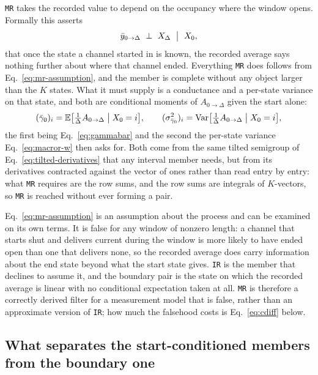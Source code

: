 \begin{appendixbox}
\texttt{MR} takes the recorded value to depend on the occupancy where the window opens. Formally
this asserts
\begin{equation}
  \bar y_{0\to\Delta} \ \perp\ X_\Delta \ \bigm|\ X_0 ,
  \label{eq:mr-assumption}
\end{equation}
that once the state a channel started in is known, the recorded average says nothing further about
where that channel ended. Everything \texttt{MR} does follows from Eq.~\ref{eq:mr-assumption}, and
the member is complete without any object larger than the $K$ states. What it must supply is a
conductance and a per-state variance on that state, and both are conditional moments of
$A_{0\to\Delta}$ given the start alone:
\begin{equation}
  (\bar\gamma_0)_{i}=\mathbb{E}\bigl[\tfrac{1}{\Delta}A_{0\to\Delta}\bigm| X_0=i\bigr],
  \qquad
  (\sigma^2_{\bar\gamma_0})_{i}
    =\mathrm{Var}\bigl[\tfrac{1}{\Delta}A_{0\to\Delta}\bigm| X_0=i\bigr],
  \label{eq:mr-objects}
\end{equation}
the first being Eq.~\ref{eq:gammabar} and the second the per-state variance
Eq.~\ref{eq:macror-w} then asks for. Both come from the same
tilted semigroup of Eq.~\ref{eq:tilted-derivatives} that any interval member needs, but from its
derivatives contracted against the vector of ones rather than read entry by entry: what
\texttt{MR} requires are the row sums, and the row sums are integrals of $K$-vectors, so
\texttt{MR} is reached without ever forming a pair.

Eq.~\ref{eq:mr-assumption} is an assumption about the process and can be examined on its own terms.
It is false for any window of nonzero length: a channel that starts shut and delivers current
during the window is more likely to have ended open than one that delivers none, so the recorded
average does carry information about the end state beyond what the start state gives.
\texttt{IR} is the member that declines to assume it, and the boundary pair is the state on which
the recorded average is linear with no conditional expectation taken at all. \texttt{MR} is
therefore a correctly derived filter for a measurement model that is false, rather than an
approximate version of \texttt{IR}; how much the falsehood costs is Eq.~\ref{eq:cdiff} below.

\subsection*{What separates the start-conditioned members from the boundary one}


\end{appendixbox}
